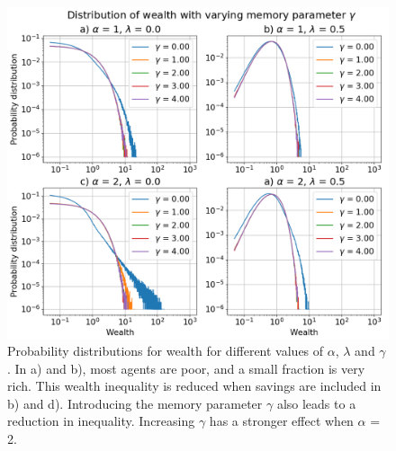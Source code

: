 \documentclass[11pt,a4paper,titlepage]{article}
\begin{document}
\begin{figure}[ht!]
\centering
\includegraphics[scale=0.4]{task_e_gamma.png}
\caption{Probability distributions for wealth for different values of $\alpha$, $\lambda$ and $\gamma$. In a) and b), most agents are poor, and a small fraction is very rich. This wealth inequality is reduced when savings are included in b) and d). Introducing the memory parameter $\gamma$ also leads to a reduction in inequality. Increasing $\gamma$ has a stronger effect when $\alpha$ = 2.    \label{fig:task_e_gamma}}
\end{figure}
\end{document}
